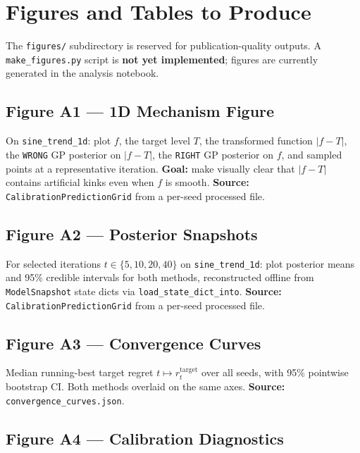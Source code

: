 \documentclass[11pt]{article}
\newcommand{\RIGHT}{\texttt{RIGHT}}
\newcommand{\WRONG}{\texttt{WRONG}}
\begin{document}
\section{Figures and Tables to Produce}
\label{sec:figures}
 
The \texttt{figures/} subdirectory is reserved for publication-quality outputs.
A \texttt{make\_figures.py} script is \textbf{not yet implemented}; figures are
currently generated in the analysis notebook.
 
\subsection{Figure A1 --- 1D Mechanism Figure}
 
On \texttt{sine\_trend\_1d}: plot $f$, the target level $T$, the transformed function
$|f-T|$, the \WRONG{} GP posterior on $|f-T|$, the \RIGHT{} GP posterior on $f$, and
sampled points at a representative iteration.
\textbf{Goal:} make visually clear that $|f-T|$ contains artificial kinks even when $f$
is smooth.
\textbf{Source:} \texttt{CalibrationPredictionGrid} from a per-seed processed file.
 
\subsection{Figure A2 --- Posterior Snapshots}
 
For selected iterations $t \in \{5, 10, 20, 40\}$ on \texttt{sine\_trend\_1d}:
plot posterior means and 95\% credible intervals for both methods, reconstructed offline
from \texttt{ModelSnapshot} state dicts via \texttt{load\_state\_dict\_into}.
\textbf{Source:} \texttt{CalibrationPredictionGrid} from a per-seed processed file.
 
\subsection{Figure A3 --- Convergence Curves}
 
Median running-best target regret $t \mapsto r_t^{\mathrm{target}}$ over all seeds,
with 95\% pointwise bootstrap CI.
Both methods overlaid on the same axes.
\textbf{Source:} \texttt{convergence\_curves.json}.
 
\subsection{Figure A4 --- Calibration Diagnostics}
 
\end{document}
